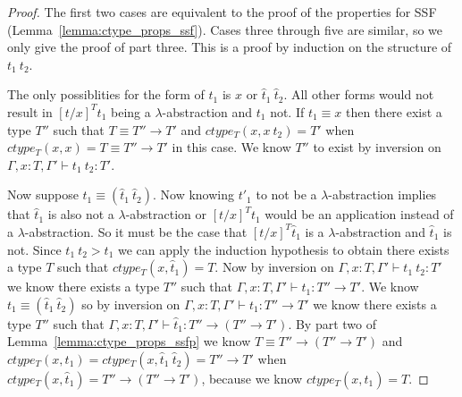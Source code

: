 \begin{proof}
  The first two cases are equivalent to the proof of the properties
  for SSF (Lemma~\ref{lemma:ctype_props_ssf}).  Cases three through five are similar, so we only give the
  proof of part three.  This is a proof by induction on the structure
  of $t_1\ t_2$.

  The only possiblities for the form of $t_1$ is $x$ or $\hat{t}_1\ \hat{t}_2$.  All other 
  forms would not result in $[t/x]^T t_1$ being a $\lambda$-abstraction and $t_1$ not.
  If $t_1 \equiv x$ then there exist a type $T''$ such that $T \equiv T'' \to T'$ and
  $ctype_T(x,x\ t_2) = T'$ when $ctype_T(x,x) = T \equiv T'' \to T'$ in this case.  We know
  $T''$ to exist by inversion on $\Gamma,x:T,\Gamma' \vdash t_1\ t_2:T'$.

  Now suppose $t_1 \equiv (\hat{t}_1\ \hat{t}_2)$.  Now knowing $t'_1$ to not be a $\lambda$-abstraction
  implies that $\hat{t}_1$ is also not a $\lambda$-abstraction or $[t/x]^T t_1$ would be an application
  instead of a $\lambda$-abstraction.  So it must be the case that $[t/x]^T \hat{t}_1$ is a $\lambda$-abstraction
  and $\hat{t}_1$ is not.  Since $t_1\ t_2 > t_1$ we can apply the induction hypothesis to obtain there exists
  a type $T$ such that $ctype_T(x,\hat{t}_1) = T$.  
  Now by inversion on $\Gamma,x:T,\Gamma' \vdash t_1\ t_2:T'$ we know there exists a type $T''$ such that
  $\Gamma,x:T,\Gamma' \vdash t_1:T'' \to T'$.  We know $t_1 \equiv (\hat{t}_1\ \hat{t}_2)$ so by inversion on
  $\Gamma,x:T,\Gamma' \vdash t_1:T'' \to T'$ we know there exists a type $T''$ such that
  $\Gamma,x:T,\Gamma' \vdash \hat{t}_1:T'' \to (T'' \to T')$.
  By part two of Lemma~\ref{lemma:ctype_props_ssfp} we know $T \equiv T'' \to (T'' \to T')$ and
  $ctype_T(x,t_1) = ctype_T(x,\hat{t}_1\ \hat{t}_2) = T'' \to T'$ 
  when $ctype_T(x,\hat{t}_1) = T'' \to (T'' \to T')$, because we know $ctype_T(x,\hat{t}_1) = T$.
\end{proof}

